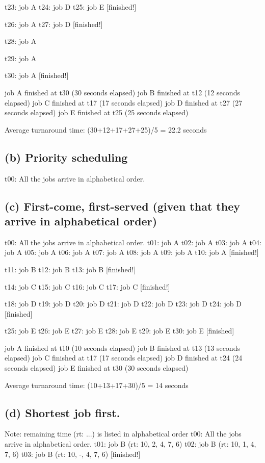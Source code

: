 \documentclass[11pt]{article}
\begin{document}
t23: job A
t24: job D
t25: job E [finished!]

t26: job A
t27: job D [finished!]

t28: job A

t29: job A

t30: job A [finished!]

job A finished at t30 (30 seconds elapsed)
job B finished at t12 (12 seconds elapsed)
job C finished at t17 (17 seconds elapsed)
job D finished at t27 (27 seconds elapsed)
job E finished at t25 (25 seconds elapsed)

Average turnaround time: (30+12+17+27+25)/5 = 22.2 seconds

\subsection*{(b) Priority scheduling}
t00: All the jobs arrive in alphabetical order. 



\subsection*{(c) First-come, first-served (given that they arrive in alphabetical order)}
t00: All the jobs arrive in alphabetical order. 
t01: job A
t02: job A
t03: job A
t04: job A
t05: job A
t06: job A
t07: job A
t08: job A
t09: job A
t10: job A [finished!]

t11: job B
t12: job B 
t13: job B [finished!]

t14: job C
t15: job C
t16: job C
t17: job C [finished!]

t18: job D
t19: job D
t20: job D
t21: job D
t22: job D
t23: job D
t24: job D [finished]

t25: job E 
t26: job E
t27: job E
t28: job E
t29: job E
t30: job E [finished]

job A finished at t10 (10 seconds elapsed)
job B finished at t13 (13 seconds elapsed)
job C finished at t17 (17 seconds elapsed)
job D finished at t24 (24 seconds elapsed)
job E finished at t30 (30 seconds elapsed)

Average turnaround time: (10+13+17+30)/5 = 14 seconds


\subsection*{(d) Shortest job first.}
Note: remaining time (rt: ...) is listed in alphabetical order
t00: All the jobs arrive in alphabetical order. 
t01: job B (rt: 10, 2, 4, 7, 6)
t02: job B (rt: 10, 1, 4, 7, 6)
t03: job B (rt: 10, -, 4, 7, 6) [finished!]
\end{document}
